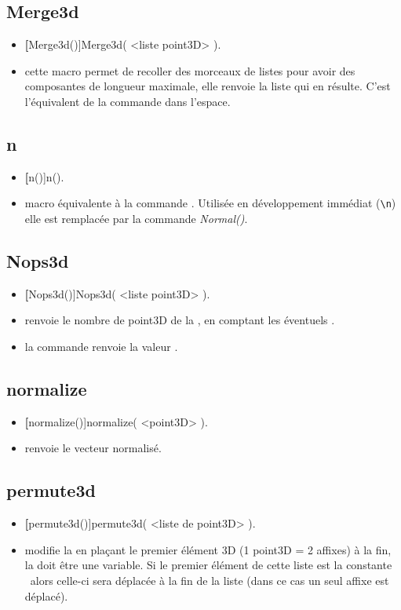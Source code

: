 \subsection{Merge3d}
\begin{itemize}
 \item \util \textbf[Merge3d()]{Merge3d( <liste point3D> )}.
 \item \desc cette macro permet de recoller des morceaux de listes pour avoir des composantes de longueur maximale, elle renvoie la liste qui en résulte. C'est l'équivalent de la commande  dans l'espace.
\end{itemize}


\subsection{n}\label{macn}
\begin{itemize}
 \item \util \textbf[n()]{n()}.
 \item \desc macro équivalente à la commande . Utilisée en développement immédiat (\verb|\n|) elle est remplacée par la commande \textsl{Normal()}.
\end{itemize}

\subsection{Nops3d}
\begin{itemize}
 \item \util \textbf[Nops3d()]{Nops3d( <liste point3D> )}.
 \item \desc renvoie le nombre de point3D de la , en comptant les éventuels \jump.
 \item \exem la commande  renvoie la valeur .
\end{itemize}

\subsection{normalize}
\begin{itemize}
 \item \util \textbf[normalize()]{normalize( <point3D> )}.
 \item \desc renvoie le vecteur normalisé.
\end{itemize}


\subsection{permute3d}
\begin{itemize}
 \item \util \textbf[permute3d()]{permute3d( <liste de point3D> )}.
 \item \desc modifie la  en plaçant le premier élément 3D (1 point3D = 2 affixes) à la fin, la  doit être une variable. Si le premier élément de cette liste est la constante \jump\ alors celle-ci sera déplacée à la fin de la liste (dans ce cas un seul affixe est déplacé).
\end{itemize}


